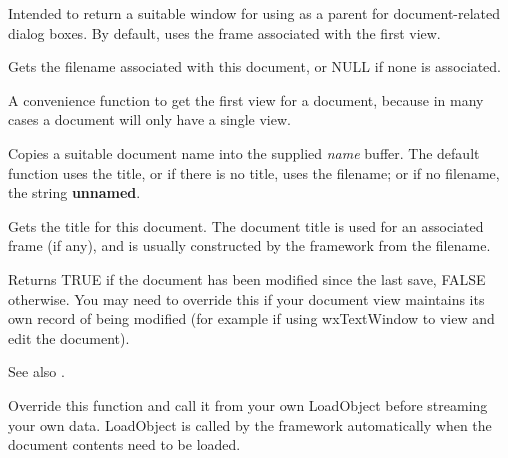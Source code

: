 

Intended to return a suitable window for using as a parent for document-related
dialog boxes. By default, uses the frame associated with the first view.



Gets the filename associated with this document, or NULL if none is
associated.



A convenience function to get the first view for a document, because
in many cases a document will only have a single view.



Copies a suitable document name into the supplied {\it name} buffer. The default
function uses the title, or if there is no title, uses the filename; or if no
filename, the string {\bf unnamed}. 



Gets the title for this document. The document title is used for an associated
frame (if any), and is usually constructed by the framework from
the filename.

\label{wxdocumentismodified}


Returns TRUE if the document has been modified since the last save, FALSE otherwise.
You may need to override this if your document view maintains its own
record of being modified (for example if using wxTextWindow to view and edit the document).

See also .



Override this function and call it from your own LoadObject before
streaming your own data. LoadObject is called by the framework
automatically when the document contents need to be loaded.

